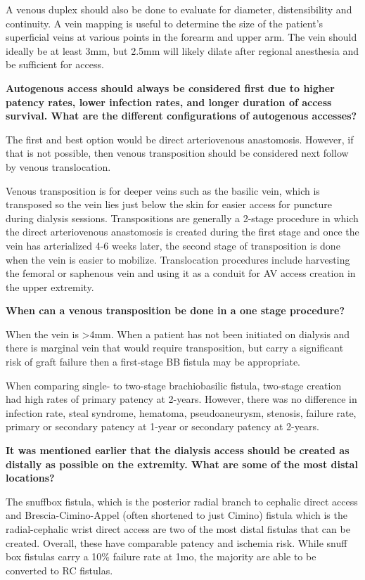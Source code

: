 \documentclass[
]{book}
\begin{document}
A venous duplex should also be done to evaluate for diameter,
distensibility and continuity. A vein mapping is useful to determine the
size of the patient's superficial veins at various points in the forearm
and upper arm. The vein should ideally be at least 3mm, but 2.5mm will
likely dilate after regional anesthesia and be sufficient for
access.\citep{huber2002, smith2012}

\textbf{Autogenous access should always be considered first due to higher
patency rates, lower infection rates, and longer duration of access
survival. What are the different configurations of autogenous
accesses?}

The first and best option would be direct arteriovenous anastomosis.
However, if that is not possible, then venous transposition should be
considered next follow by venous translocation.

Venous transposition is for deeper veins such as the basilic vein, which
is transposed so the vein lies just below the skin for easier access for
puncture during dialysis sessions. Transpositions are generally a
2-stage procedure in which the direct arteriovenous anastomosis is
created during the first stage and once the vein has arterialized 4-6
weeks later, the second stage of transposition is done when the vein is
easier to mobilize. Translocation procedures include harvesting the
femoral or saphenous vein and using it as a conduit for AV access
creation in the upper extremity.

\textbf{When can a venous transposition be done in a one stage procedure?}

When the vein is \textgreater4mm. When a patient has not been initiated on
dialysis and there is marginal vein that would require transposition,
but carry a significant risk of graft failure then a first-stage BB
fistula may be appropriate.

When comparing single- to two-stage brachiobasilic fistula, two-stage
creation had high rates of primary patency at 2-years. However, there
was no difference in infection rate, steal syndrome, hematoma,
pseudoaneurysm, stenosis, failure rate, primary or secondary patency at
1-year or secondary patency at 2-years.\citep{junyanwee2018}

\textbf{It was mentioned earlier that the dialysis access should be created as
distally as possible on the extremity. What are some of the most distal
locations?}

The snuffbox fistula, which is the posterior radial branch to cephalic
direct access and Brescia-Cimino-Appel (often shortened to just Cimino)
fistula which is the radial-cephalic wrist direct access are two of the
most distal fistulas that can be created. Overall, these have comparable
patency and ischemia risk. While snuff box fistulas carry a 10\% failure
rate at 1mo, the majority are able to be converted to RC
fistulas.\citep{siracuse2019}
\end{document}
